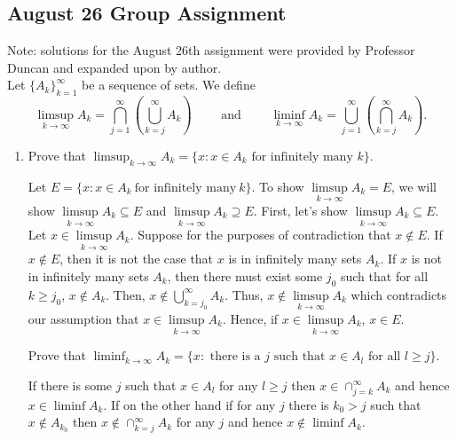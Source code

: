 
\subsection{August 26 Group Assignment}
Note: solutions for the August 26th assignment were provided by Professor Duncan and expanded upon by author.\\
Let $ \{ A_k \}_{k=1}^{\infty}$ be a sequence of sets. We define \[ \limsup_{k \rightarrow \infty} A_k = \bigcap_{j=1}^{\infty} \left( \bigcup_{k=j}^{\infty} A_k \right) \qquad  \text{ and } \qquad  \liminf_{k \rightarrow \infty} A_k = \bigcup_{j=1}^{\infty} \left( \bigcap_{k=j}^{\infty} A_k \right). \]

\begin{enumerate}


\item Prove that $\limsup_{k \rightarrow \infty} A_k = \{ x : x \in A_k \mbox{ for infinitely many } k \}.$
\begin{pf}
	Let $E= \{ x:x \in A_k\ \text{for infinitely many} \ k \}$.  To show $\limsup \limits_{k \rightarrow \infty} A_k =E$, we will show $\limsup \limits_{k \rightarrow \infty} A_k \subseteq E$ and $\limsup \limits_{k \rightarrow \infty} A_k \supseteq E$.
	 First, let's show $\limsup \limits_{k\rightarrow \infty} A_k \subseteq E$. Let $x \in \limsup \limits_{k\rightarrow \infty} A_k$. Suppose for the purposes of contradiction that $x \notin E$. If $x \notin E$, then it is not the case that $x$ is in infinitely many sets $A_k$. If $x$ is not in infinitely many sets $A_k$, then there must exist some $j_0$ such that for all $k\geq j_0$, $x \notin A_k$. Then, $x \notin \bigcup_{k=j_0}^\infty A_k$.  Thus, $x \notin \limsup \limits_{k\rightarrow \infty} A_k$ which contradicts our assumption that $x \in \limsup \limits_{k\rightarrow \infty} A_k$. Hence, if $x \in \limsup \limits_{k\rightarrow \infty} A_k$, $x \in E$.\\
\end{pf}

\noindent Prove that $\liminf_{k \rightarrow \infty} A_k = \{ x: \mbox{ there is a } j \mbox{ such that } x \in A_l \mbox{ for all } l \geq j \}.$

\begin{pf}
If there is some $j$ such that $ x \in A_l$ for any $ l \geq j$ then $x \in \cap_{j=k}^{\infty} A_k$ and hence $ x \in \liminf A_k$.  If on the other hand if for any $j$ there is $k_0 > j$ such that $ x \not\in  A_{k_0}$ then $ x \not\in \cap_{k=j}^{\infty} A_k$ for any $j$ and hence $ x \not\in \liminf A_k$.\\
\end{pf}


\end{enumerate}
